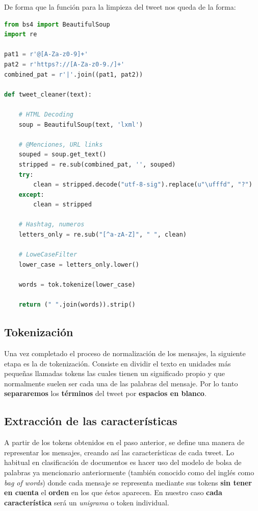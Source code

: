 \documentclass[a4paper,12pt]{report}
\begin{document}
De forma que la función para la limpieza del tweet nos queda de la forma: 

\vspace{2mm}
\begin{lstlisting}[language=Python]
from bs4 import BeautifulSoup
import re

pat1 = r'@[A-Za-z0-9]+'
pat2 = r'https?://[A-Za-z0-9./]+'
combined_pat = r'|'.join((pat1, pat2))

def tweet_cleaner(text):
    
    # HTML Decoding
    soup = BeautifulSoup(text, 'lxml')
    
    # @Menciones, URL links
    souped = soup.get_text()
    stripped = re.sub(combined_pat, '', souped)
    try:
        clean = stripped.decode("utf-8-sig").replace(u"\ufffd", "?")
    except:
        clean = stripped
    
    # Hashtag, numeros
    letters_only = re.sub("[^a-zA-Z]", " ", clean)
    
    # LoweCaseFilter
    lower_case = letters_only.lower()
    
    words = tok.tokenize(lower_case)
    
    return (" ".join(words)).strip()

\end{lstlisting}


\subsection{Tokenización}

{\setlength{\parindent}{0cm}
Una vez completado el proceso de normalización de los mensajes, la siguiente etapa es la de tokenización. Consiste en dividir el texto en unidades más pequeñas llamadas tokens las cuales tienen un significado propio y que normalmente suelen ser cada una de las palabras del mensaje. Por lo tanto \textbf{separaremos } los \textbf{términos} del tweet por \textbf{espacios en blanco}. }

\vspace{4mm}
\subsection{Extracción de las características}

{\setlength{\parindent}{0cm}
A partir de los tokens obtenidos en el paso anterior, se define una manera de representar los mensajes, creando así las características de cada tweet. Lo habitual en clasificación de documentos es hacer uso del modelo de bolsa de palabras ya mencionario anteriormente (también conocido como del inglés como \textit{bag of words}) donde cada mensaje se representa mediante sus tokens \textbf{sin tener en cuenta} el \textbf{orden} en los que éstos aparecen. En nuestro caso \textbf{cada característica} será un \textit{unigrama} o token individual. }
\end{document}
